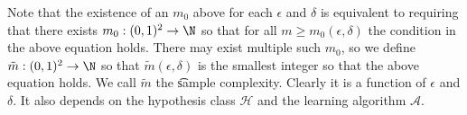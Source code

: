 Note that the existence of an $m_0$ above for each $\epsilon $ and $\delta $ is equivalent to requiring that there exists $m_0: (0, 1)^2 \to \N$ so that for all $m \geq m_0(\epsilon ,\delta )$ the condition in the above equation holds.
There may exist multiple such $m_0$, so we define $\tilde{m}: (0, 1)^2 \to \N  $ so that $\tilde{m}(\epsilon ,\delta )$ is the smallest integer so that the above equation holds.
We call $\tilde{m}$ the \t{sample complexity}.
Clearly it is a function of $\epsilon $ and $\delta $.
It also depends on the hypothesis class $\mathcal{H} $ and the learning algorithm $\mathcal{A} $.

\blankpage